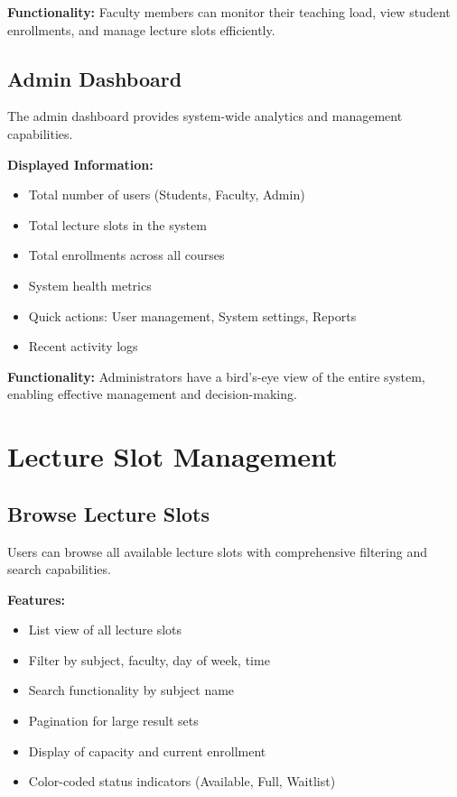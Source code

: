 \textbf{Functionality:} Faculty members can monitor their teaching load, view student enrollments, and manage lecture slots efficiently.

\subsection{Admin Dashboard}
The admin dashboard provides system-wide analytics and management capabilities.

\textbf{Displayed Information:}
\begin{itemize}
    \item Total number of users (Students, Faculty, Admin)
    \item Total lecture slots in the system
    \item Total enrollments across all courses
    \item System health metrics
    \item Quick actions: User management, System settings, Reports
    \item Recent activity logs
\end{itemize}

\textbf{Functionality:} Administrators have a bird's-eye view of the entire system, enabling effective management and decision-making.

\section{Lecture Slot Management}

\subsection{Browse Lecture Slots}
Users can browse all available lecture slots with comprehensive filtering and search capabilities.

\textbf{Features:}
\begin{itemize}
    \item List view of all lecture slots
    \item Filter by subject, faculty, day of week, time
    \item Search functionality by subject name
    \item Pagination for large result sets
    \item Display of capacity and current enrollment
    \item Color-coded status indicators (Available, Full, Waitlist)
\end{itemize}

